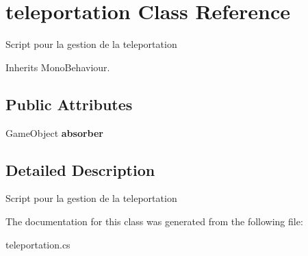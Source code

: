 \hypertarget{classteleportation}{\section{teleportation Class Reference}
\label{classteleportation}
}


Script pour la gestion de la teleportation  




Inherits Mono\+Behaviour.

\subsection*{Public Attributes}
\begin{DoxyCompactItemize}
\item 
\hypertarget{classteleportation_a5aa882573f54205143f326c5c888c118}{Game\+Object {\bfseries absorber}}\label{classteleportation_a5aa882573f54205143f326c5c888c118}

\end{DoxyCompactItemize}


\subsection{Detailed Description}
Script pour la gestion de la teleportation 



The documentation for this class was generated from the following file\+:\begin{DoxyCompactItemize}
\item 
teleportation.\+cs\end{DoxyCompactItemize}
